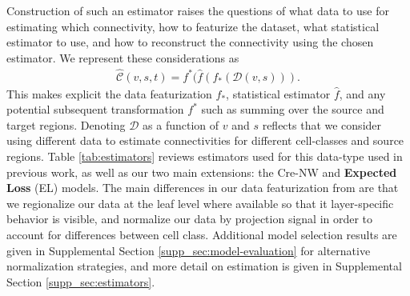 Construction of such an estimator raises the questions of what data to use for estimating which connectivity, how to featurize the dataset, what statistical estimator to use, and how to reconstruct the connectivity using the chosen estimator.
We represent these considerations as 
\begin{align}
\label{eq:estimator}
\widehat { \mathcal C }(v,s,t) = f^* (\widehat f (f_*( \mathcal D(v,s))).
\end{align}
This makes explicit the data featurization $f_{*}$, statistical estimator $\widehat f$, and any potential subsequent transformation $f^*$ such as summing over the source and target regions.
Denoting $ \mathcal D$ as a function of $v$ and $s$ reflects that we consider using different data to estimate connectivities for different cell-classes and source regions.
Table \ref{tab:estimators} reviews estimators used for this data-type used in previous work, as well as our two main extensions: the Cre-NW and \textbf{Expected Loss} (EL) models.
The main differences in our data featurization from \citep{Knox2019-ot} are that we regionalize our data at the leaf level where available so that it layer-specific behavior is visible, and normalize our data by projection signal in order to account for differences between cell class.
Additional model selection results are given in Supplemental Section \ref{supp_sec:model-evaluation} for alternative normalization strategies, and more detail on estimation is given in Supplemental Section \ref{supp_sec:estimators}.


